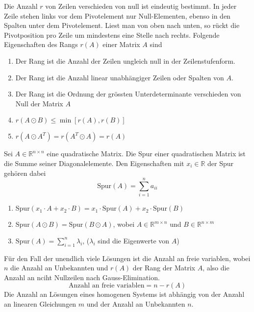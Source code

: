 \newline\newline
Die Anzahl $r$ von Zeilen verschieden von null ist eindeutig bestimmt. In jeder Zeile stehen links vor dem Pivotelement nur Null-Elementen, ebenso in den Spalten unter dem Pivotelement. Liest man von oben nach unten, so rückt die Pivotposition pro Zeile um mindestens eine Stelle nach rechts. Folgende Eigenschaften des Rangs $r(A)$ einer Matrix $A$ sind
\begin{enumerate}[$(i)$]
\item Der Rang ist die Anzahl der Zeilen ungleich null in der Zeilenstufenform.
\item Der Rang ist die Anzahl linear unabhängiger Zeilen oder Spalten von $A$.
\item Der Rang ist die Ordnung der grössten Unterdeterminante verschieden von Null der Matrix $A$ 
\item $r\left(A\odot B\right)\leq \min\left[r\left(A\right), r\left(B\right)\right]$
\item $r\left(A\odot A^T\right)=r\left(A^T\odot A\right)=r\left(A\right)$
\end{enumerate}
Sei $A\in\mathbb{R}^{n\times n}$ eine quadratische Matrix. Die Spur einer quadratischen Matrix ist die Summe seiner Diagonalelemente. Den Eigenschaften mit $x_i\in \mathbb{R}$ der Spur gehören dabei
\begin{equation}
\boxed{\text{Spur}\left(A\right)=\displaystyle \sum_{i=1}^na_{ii}}
\end{equation}
\begin{enumerate}[$(i)$]
\item $\text{Spur}\left(x_1\cdot A+x_2\cdot B\right)=x_1\cdot \text{Spur}\left(A\right)+x_2\cdot \text{Spur}\left(B\right)$
\item $\text{Spur}\left(A\odot B\right)=\text{Spur}\left(B\odot A\right)$, wobei $A\in\mathbb{R}^{m\times n}$ und $B\in\mathbb{R}^{n\times m}$ 
\item $\text{Spur}\left(A\right)=\displaystyle \sum_{i=1}^n\lambda_i$, ($\lambda_i$ sind die Eigenwerte von $A$)
\end{enumerate}
Für den Fall der unendlich viele Lösungen ist die Anzahl an freie variablen, wobei $n$ die Anzahl an Unbekannten und $r(A)$ der Rang der Matrix $A$, also die Anzahl an nciht Nullzeilen nach Gauss-Elimination. 
\begin{equation}
\boxed{\text{Anzahl an freie variablen} = n-r(A)}
\end{equation}
Die Anzahl an Lösungen eines homogenen Systems ist abhängig von der Anzahl an linearen Gleichungen $m$ und der Anzahl an Unbekannten $n$.
